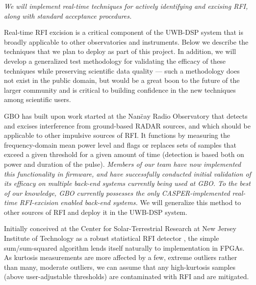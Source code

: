 \documentclass[10pt]{myNSF}
\begin{document}
\emph{We will implement real-time techniques for actively identifying
  and excising RFI, along with standard acceptance procedures.}

Real-time RFI excision is a critical component of the UWB-DSP system
that is broadly applicable to other observatories and instruments.
Below we describe the techniques that we plan to deploy as part of
this project.  In addition, we will develop a generalized test
methodology for validating the efficacy of these techniques while
preserving scientific data quality --- such a methodology does not
exist in the public domain, but would be a great boon to the future of
the larger community and is critical to building confidence in the new
techniques among scientific users.

 GBO has built upon
work started at the Nan\"{c}ay Radio Observatory \citep{dwr17} that
detects and excises interference from ground-based RADAR sources, and
which should be applicable to other impulsive sources of RFI.  It
functions by measuring the frequency-domain mean power level and flags
or replaces sets of samples that exceed a given threshold for a given
amount of time (detection is based both on power and duration of the
pulse).  \emph{Members of our team have now implemented this
  functionality in firmware, and have successfully conducted initial
  validation of its efficacy on multiple back-end systems currently
  being used at GBO.  To the best of our knowledge, GBO currently
  possesses the only CASPER-implemented real-time RFI-excision enabled
  back-end systems.}  We will generalize this method to other sources
of RFI and deploy it in the UWB-DSP system.

 Initially conceived at the Center for
Solar-Terrestrial Research at New Jersey Institute of Technology as a
robust statistical RFI detector \citep{ng10,nhmg16}, the simple
sum/sum-squared algorithm lends itself naturally to implementation in
FPGAs.  As kurtosis measurements are more affected by a few, extreme
outliers rather than many, moderate outliers, we can assume that any
high-kurtosis samples (above user-adjustable thresholds) are
contaminated with RFI and are mitigated.
\end{document}
